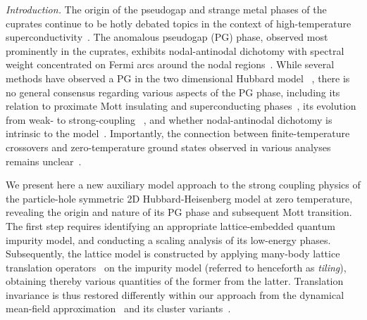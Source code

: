 \documentclass[%
 reprint,
superscriptaddress,
groupedaddress,
 amsmath,amssymb,
 aps,
prl,superscriptaddress
]{revtex4-2}
\begin{document}
\maketitle

\par\noindent\textit{Introduction.}
The origin of the pseudogap and strange metal phases of the cuprates continue to be hotly debated topics in the context of high-temperature superconductivity~\cite{keimer2015quantum}. The anomalous pseudogap (PG) phase, observed most prominently in the cuprates, exhibits nodal-antinodal dichotomy with spectral weight 
concentrated on Fermi arcs around the nodal regions~\cite{loeserKapitulnik1996,Norman1998,Hashimoto2014}. While several methods have observed a PG in the two dimensional Hubbard model ~\cite{KyungKotliar2006,MacridinAzevedo2006,WuFerrero2018,anirbanmott2,HilleAndergassen2020}, there is no general consensus regarding various aspects of the PG phase, including its relation to proximate Mott insulating and superconducting phases~\cite{FradkinRevModPhys2015,anirbanmott2,Kitatani2023,Sorella2023}, its evolution from weak- to strong-coupling ~\cite{HuangDevereaux2018,Fedor2022,SimkovicFerrero2024}, and whether nodal-antinodal dichotomy is intrinsic to the model~\cite{Hashimoto2014,Schafer2021}. Importantly, the connection between finite-temperature crossovers and zero-temperature ground states observed in various analyses remains unclear~\cite{White1998,Ido2018,ProustTaillefer2019,Ponsioen2019,Shengtao2021,XuZhang2022}.

We present here a new auxiliary model approach 
to the strong coupling physics of the particle-hole symmetric 2D Hubbard-Heisenberg model at zero temperature, revealing the origin and nature of its PG phase and subsequent Mott transition. The first step 
requires identifying an appropriate lattice-embedded quantum impurity model, and conducting a scaling analysis of its low-energy phases. Subsequently, the lattice model is  constructed by applying many-body lattice translation operators~\cite{stoyanova} on the impurity model (referred to henceforth as \textit{tiling}), obtaining thereby various quantities
of the former from the latter. Translation invariance is thus restored differently within our approach from the dynamical mean-field approximation~\cite{georges1996} and its cluster variants~\cite{Hettler2000DCA,Kotliar2001Cellular,Maier2005,Sakai2023}. 
\end{document}
